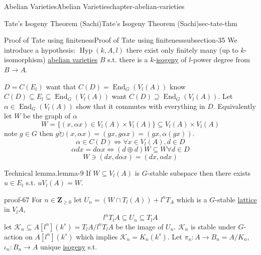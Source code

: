 \documentclass[oneside,10pt,]{book}
\numberwithin{equation}{section}
\newcommand{\lb}{[}
\newcommand{\rb}{]}
\newcommand{\ZZ}{\mathbf{Z}}
\newcommand{\acts}{\circlearrowright}
\DeclareMathOperator{\End}{End}
\begin{document}
\begin{chapterptx}{Abelian Varieties}{}{Abelian Varieties}{}{}{chapter-abelian-varieties}
\begin{sectionptx}{Tate's Isogeny Theorem (Sachi)}{}{Tate's Isogeny Theorem (Sachi)}{}{}{sec-tate-thm}
%
%
\typeout{************************************************}
\typeout{************************************************}
%
\begin{subsectionptx}{Proof of Tate using finiteness}{}{Proof of Tate using finiteness}{}{}{subsection-35}
\hypertarget{p-391}{}%
We introduce a hypothesis: \(\operatorname{Hyp}(k,A,l)\) there exist only finitely many (up to \(k\)-isomorphism) \hyperref[def-buntes-abvar]{abelian varieties} \(B\) s.t. there is a \(k\)-\hyperref[def-supersing-isog-isog]{isogeny} of \(l\)-power degree from \(B\to A\).%
\par
\hypertarget{p-392}{}%
\(D =C(E_l)\) want that \(C(D) = \End_G(V_l(A))\) know \(C(D) \subseteq E_l \subseteq \End_G(V_l(A))\) want \(C(D) \supseteq \End_G(V_l(A))\). Let \(\alpha \in \End_G(V_l(A))\) show that it commutes with everything in \(D\). Equivalently let \(W\) be the graph of \(\alpha\)%
\begin{equation*}
W = \{(x,\alpha x) \in V_l(A)\times V_l(A)\} \subseteq V_l(A)\times V_l(A)
\end{equation*}
note \(g\in G\) then \(g\acts (x,\alpha x) = (gx,g\alpha x ) = (gx, \alpha(gx))\).%
\begin{equation*}
\alpha\in C(D) \iff \forall x\in V_l(A), d\in D
\end{equation*}
%
\begin{equation*}
\alpha d x = d\alpha x \iff (d\oplus d)W \subseteq W \forall d\in D
\end{equation*}
%
\begin{equation*}
W\ni (dx, d\alpha x) = (dx, \alpha d x)
\end{equation*}
%
\begin{lemma}{Technical lemma.}{}{lemma-9}%
\hypertarget{p-393}{}%
If \(W\subseteq V_l(A)\) is \(G\)-stable subspace then there exists \(u\in E_l\) s.t. \(u V_l(A) = W\).%
\end{lemma}
\begin{proofptx}{}{proof-67}
\hypertarget{p-394}{}%
For \(n \in \ZZ_{\ge 0}\) let \(U_n = (W\cap T_l(A)) + l^n T_A\) which is a \(G\)-stable \hyperref[def-buntes-lattice]{lattice} in \(V_l A\),%
\begin{equation*}
l^nT_lA \subseteq U_n \subseteq T_l A
\end{equation*}
let \(\mathcal K_n \subseteq A\lb l^n \rb (k^s) = T_l A/ l^n T_l A\) be the image of \(U_n\). \(\mathcal K_n\) is stable under \(G\)-action on \(A\lb l^n \rb (k^s)\) which implies \(\mathcal K_n = K_n (k^s)\). Let \(\pi_n \colon A \to B_n = A/ K_n\), \(\iota_n \colon B_n \to A\) unique \hyperref[def-supersing-isog-isog]{isogeny} s.t.%

\end{proofptx}
\end{subsectionptx}
\end{sectionptx}
\end{chapterptx}
\end{document}
